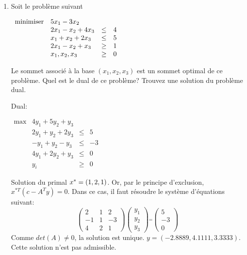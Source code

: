 \begin{enumerate}
    \begin{solution}
    \end{solution}

  \item Soit le problème suivant

    $
    \begin{array}{llcr}
      \mbox{minimiser} & 5x_1-3x_2\\
      & 2x_1-x_2 +4x_3 & \leq & 4\\
      & x_1+x_2 +2x_3 & \leq & 5\\
      & 2x_1-x_2 +x_3 & \geq & 1\\
      & x_1, x_2, x_3 & \geq & 0
    \end{array}
    $

    Le sommet associé à la base $(x_1, x_2, x_3)$ est un sommet optimal de ce problème. Quel est le dual de ce problème? Trouvez une solution du problème dual.


    \begin{solution}
      Dual:

      $
      \begin{array}{llcr}
        \max & 4y_{1} + 5y_{2} + y_{3}\\
        & 2y_{1} + y_{2}  + 2y_{3} & \leq & 5\\
        & -y_{1} + y_{2}  -y_{3} & \leq & -3\\
        & 4y_{1} + 2y_{2}  + y_{3} & \leq & 0\\
        & y_{i} & \geq & 0
      \end{array}
      $

      Solution du primal $x^* = (1,2,1)$.
      Or, par le principe d'exclusion, $x^{*T}(c -A^{T}y) = 0$.
      Dans ce cas, il faut résoudre le système d'équations suivant:
      \[
        \begin{pmatrix}
          2 & 1 & 2\\
          -1 & 1 & -3\\
          4 & 2 & 1
        \end{pmatrix}
        \begin{pmatrix}
          y_{1}\\
          y_{2}\\
          y_{3}
        \end{pmatrix}
        \stackrel{=}{}
        \begin{pmatrix}
          5\\
          -3\\
          0
        \end{pmatrix}
      \]
      Comme $det(A) \ne 0$, la solution est unique. $y = (-2.8889, 4.1111,3.3333)$. Cette solution n'est pas admissible.
    \end{solution}


\end{enumerate}
